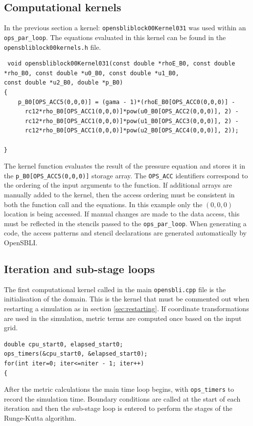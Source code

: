 \documentclass[11pt]{article}
\begin{document}
\subsection{Computational kernels}
In the previous section a kernel: \verb|opensbliblock00Kernel031| was used within an \verb|ops_par_loop|. The equations evaluated in this kernel can be found in the \verb|opensbliblock00kernels.h| file.
\begin{lstlisting}
 void opensbliblock00Kernel031(const double *rhoE_B0, const double *rho_B0, const double *u0_B0, const double *u1_B0,
const double *u2_B0, double *p_B0)
{
    p_B0[OPS_ACC5(0,0,0)] = (gama - 1)*(rhoE_B0[OPS_ACC0(0,0,0)] -
      rc12*rho_B0[OPS_ACC1(0,0,0)]*pow(u0_B0[OPS_ACC2(0,0,0)], 2) -
      rc12*rho_B0[OPS_ACC1(0,0,0)]*pow(u1_B0[OPS_ACC3(0,0,0)], 2) -
      rc12*rho_B0[OPS_ACC1(0,0,0)]*pow(u2_B0[OPS_ACC4(0,0,0)], 2));

}
\end{lstlisting}
The kernel function evaluates the result of the pressure equation and stores it in the \verb|p_B0[OPS_ACC5(0,0,0)]| storage array. The \verb|OPS_ACC| identifiers correspond to the ordering of the input arguments to the function. If additional arrays are manually added to the kernel, then the access ordering must be consistent in both the function call and the equations. In this example only the $(0,0,0)$ location is being accessed. If manual changes are made to the data access, this must be reflected in the stencils passed to the \verb|ops_par_loop|. When generating a code, the access patterns and stencil declarations are generated automatically by OpenSBLI.


\subsection{Iteration and sub-stage loops}
The first computational kernel called in the main \verb|opensbli.cpp| file is the initialisation of the domain. This is the kernel that must be commented out when restarting a simulation as in section \ref{sec:restarting}. If coordinate transformations are used in the simulation, metric terms are computed once based on the input grid. 

\begin{lstlisting}
double cpu_start0, elapsed_start0;
ops_timers(&cpu_start0, &elapsed_start0);
for(int iter=0; iter<=niter - 1; iter++)
{
\end{lstlisting}
After the metric calculations the main time loop begins, with \verb|ops_timers| to record the simulation time. Boundary conditions are called at the start of each iteration and then the sub-stage loop is entered to perform the stages of the Runge-Kutta algorithm.
\end{document}

